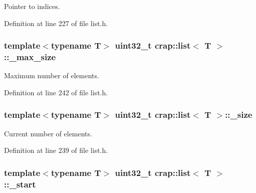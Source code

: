Pointer to indices. 



Definition at line 227 of file list.\+h.

\hypertarget{classcrap_1_1list_ae71931f777bfb9dd77a8a4acfd0eb84c}{
\subsubsection[{\+\_\+max\+\_\+size}]{\setlength{\rightskip}{0pt plus 5cm}template$<$typename T$>$ uint32\+\_\+t {\bf crap\+::list}$<$ T $>$\+::\+\_\+max\+\_\+size\hspace{0.3cm}{\ttfamily [protected]}}}\label{classcrap_1_1list_ae71931f777bfb9dd77a8a4acfd0eb84c}


Maximum number of elements. 



Definition at line 242 of file list.\+h.

\hypertarget{classcrap_1_1list_a8c38722c28fc087444acc484f7b0aa38}{
\subsubsection[{\+\_\+size}]{\setlength{\rightskip}{0pt plus 5cm}template$<$typename T$>$ uint32\+\_\+t {\bf crap\+::list}$<$ T $>$\+::\+\_\+size\hspace{0.3cm}{\ttfamily [protected]}}}\label{classcrap_1_1list_a8c38722c28fc087444acc484f7b0aa38}


Current number of elements. 



Definition at line 239 of file list.\+h.

\hypertarget{classcrap_1_1list_a0bf2b54bd0906b835d8a4d18d41717ce}{
\subsubsection[{\+\_\+start}]{\setlength{\rightskip}{0pt plus 5cm}template$<$typename T$>$ uint32\+\_\+t {\bf crap\+::list}$<$ T $>$\+::\+\_\+start\hspace{0.3cm}{\ttfamily [protected]}}}\label{classcrap_1_1list_a0bf2b54bd0906b835d8a4d18d41717ce}


